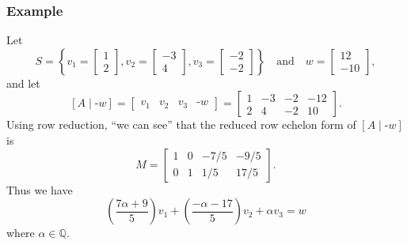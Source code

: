 \documentclass{memoir}
\begin{document}
\subsubsection*{Example}

Let \[ S = \left\{ v_1 = \begin{bmatrix} 1 \\ 2 \end{bmatrix}, v_2 = \begin{bmatrix} -3 \\ 4 \end{bmatrix}, v_3 = \begin{bmatrix} -2 \\ -2 \end{bmatrix} \right\} \quad \mathrm{and} \quad w = \begin{bmatrix} 12 \\ -10 \end{bmatrix}, \] and let \[ [A \mid \text{-}w] = \left[ \begin{array}{c|c|c|c} v_1 & v_2 & v_3 & \text{-}w \end{array} \right] = \begin{bmatrix} 1 & -3 & -2 & -12 \\ 2 & 4 & -2 & 10 \end{bmatrix}. \] Using row reduction, ``we can see'' that the reduced row echelon form of $[A \mid \text{-}w]$ is \[ M = \begin{bmatrix} 1 & 0 & -7/5 & -9/5 \\ 0 & 1 & 1/5 & 17/5 \end{bmatrix}. \] Thus we have \[ \left(\frac{7\alpha + 9}{5}\right) v_1 + \left(\frac{-\alpha - 17}{5}\right)v_2 + \alpha v_3 = w \] where $\alpha \in \mathbb{Q}$.
\end{document}
